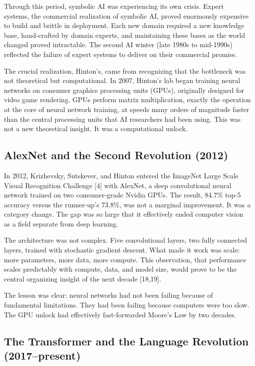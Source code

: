 \documentclass[12pt]{article}
\begin{document}
Through this period, symbolic AI was experiencing its own crisis. Expert
systems, the commercial realization of symbolic AI, proved enormously
expensive to build and brittle in deployment. Each new domain required a
new knowledge base, hand-crafted by domain experts, and maintaining
these bases as the world changed proved intractable. The second AI
winter (late 1980s to mid-1990s) reflected the failure of expert systems
to deliver on their commercial promise.

The crucial realization, Hinton's, came from recognizing that the
bottleneck was not theoretical but computational. In 2007, Hinton's lab
began training neural networks on consumer graphics processing units
(GPUs), originally designed for video game rendering. GPUs perform
matrix multiplication, exactly the operation at the core of neural
network training, at speeds many orders of magnitude faster than the
central processing units that AI researchers had been using. This was
not a new theoretical insight. It was a computational unlock.

\subsection{AlexNet and the Second Revolution (2012)}\label{alexnet-and-the-second-revolution-2012}

In 2012, Krizhevsky, Sutskever, and Hinton entered the ImageNet Large
Scale Visual Recognition Challenge {[}4{]} with AlexNet, a deep
convolutional neural network trained on two consumer-grade Nvidia GPUs.
The result, 84.7\% top-5 accuracy versus the runner-up's 73.8\%, was not
a marginal improvement. It was a category change. The gap was so large
that it effectively ended computer vision as a field separate from deep
learning.

The architecture was not complex. Five convolutional layers, two fully
connected layers, trained with stochastic gradient descent. What made it
work was scale: more parameters, more data, more compute. This
observation, that performance scales predictably with compute, data, and
model size, would prove to be the central organizing insight of the next
decade {[}18,19{]}.

The lesson was clear: neural networks had not been failing because of
fundamental limitations. They had been failing because computers were
too slow. The GPU unlock had effectively fast-forwarded Moore's Law by
two decades.

\subsection{The Transformer and the Language Revolution (2017--present)}\label{the-transformer-and-the-language-revolution-2017present}
\end{document}
